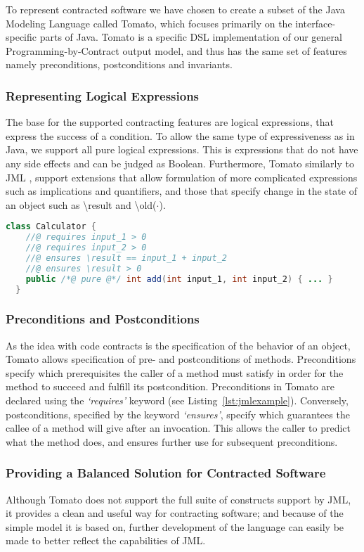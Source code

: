 To represent contracted software we have chosen to create a subset of the
Java Modeling Language called Tomato,
which focuses primarily on the interface-specific parts of Java.
Tomato is a specific DSL implementation of our general Programming-by-Contract output model, and thus has the same set of features
namely preconditions, postconditions and invariants.

\subsubsection{Representing Logical Expressions}
\label{sub:Representing Logical Expressions}
The base for the supported contracting features are logical expressions, that express
the success of a condition.
To allow the same type of expressiveness as in Java, we support all pure
logical expressions. This is expressions that do not have any side effects and can be judged as Boolean.
Furthermore, Tomato similarly to JML \cite{leavens2006design},
support extensions that allow formulation of more complicated
expressions such as implications and quantifiers,
and those that specify change in the state of an object such as \textbackslash result
and \textbackslash old($\cdot$).

\begin{lstlisting}[language=Java,caption={Contracted Method for Adding Natural Numbers},label={lst:jmlexample}]
  class Calculator {
    //@ requires input_1 > 0
    //@ requires input_2 > 0
    //@ ensures \result == input_1 + input_2
    //@ ensures \result > 0
    public /*@ pure @*/ int add(int input_1, int input_2) { ... }
  }
\end{lstlisting}

\subsubsection{Preconditions and Postconditions}
\label{sub:Preconditions and Postconditions}

As the idea with code contracts is the specification of the behavior of
an object, Tomato allows specification of pre- and postconditions of methods.
Preconditions specify which prerequisites the caller of a method must
satisfy in order for the method to succeed and fulfill its postcondition.
Preconditions in Tomato are declared using the \emph{`requires'}
keyword (see Listing~\ref{lst:jmlexample}).
Conversely, postconditions, specified by the keyword \emph{`ensures'},
specify which guarantees the callee of a method will give after an invocation.
This allows the caller to predict what the method does,
and ensures further use for subsequent preconditions.

\subsubsection{Providing a Balanced Solution for Contracted Software}
\label{ssub:ProvidingaBalancedSolutionforContractedSoftware}
Although Tomato does not support the full suite of constructs support by JML, it provides a clean and useful way for contracting software; and because of 
the simple model it is based on, further development of the language can easily be made to better reflect the capabilities of JML.